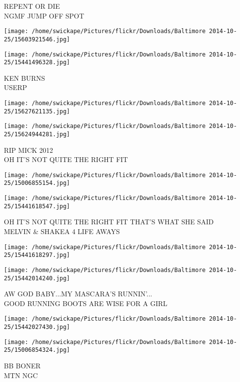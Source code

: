 \documentclass[10pt,letterpaper]{article}
\begin{document}
REPENT OR DIE\\
NGMF JUMP OFF SPOT
\pagebreak

\texttt{[image: /home/swickape/Pictures/flickr/Downloads/Baltimore 2014-10-25/15603921546.jpg]}

\vspace{0.25in}
\texttt{[image: /home/swickape/Pictures/flickr/Downloads/Baltimore 2014-10-25/15441496328.jpg]}

KEN BURNS\\
USERP
\pagebreak

\texttt{[image: /home/swickape/Pictures/flickr/Downloads/Baltimore 2014-10-25/15627621135.jpg]}

\vspace{0.25in}
\texttt{[image: /home/swickape/Pictures/flickr/Downloads/Baltimore 2014-10-25/15624944281.jpg]}

RIP MICK 2012\\
OH IT'S NOT QUITE THE RIGHT FIT
\pagebreak

\texttt{[image: /home/swickape/Pictures/flickr/Downloads/Baltimore 2014-10-25/15006855154.jpg]}

\vspace{0.25in}
\texttt{[image: /home/swickape/Pictures/flickr/Downloads/Baltimore 2014-10-25/15441618547.jpg]}

OH IT'S NOT QUITE THE RIGHT FIT THAT'S WHAT SHE SAID\\
MELVIN \& SHAKEA 4 LIFE AWAYS
\pagebreak

\texttt{[image: /home/swickape/Pictures/flickr/Downloads/Baltimore 2014-10-25/15441618297.jpg]}

\vspace{0.25in}
\texttt{[image: /home/swickape/Pictures/flickr/Downloads/Baltimore 2014-10-25/15442014240.jpg]}

AW GOD BABY...MY MASCARA'S RUNNIN'...\\
GOOD RUNNING BOOTS ARE WISE FOR A GIRL
\pagebreak

\texttt{[image: /home/swickape/Pictures/flickr/Downloads/Baltimore 2014-10-25/15442027430.jpg]}

\vspace{0.25in}
\texttt{[image: /home/swickape/Pictures/flickr/Downloads/Baltimore 2014-10-25/15006854324.jpg]}

BB BONER\\
MTN NGC
\pagebreak
\end{document}
